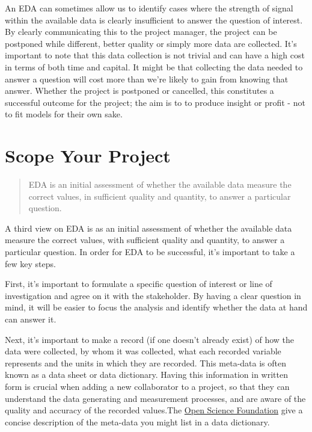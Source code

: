 \documentclass[
  letterpaper,
  DIV=11,
  numbers=noendperiod]{scrreprt}
\begin{document}
An EDA can sometimes allow us to identify cases where the strength of
signal within the available data is clearly insufficient to answer the
question of interest. By clearly communicating this to the project
manager, the project can be postponed while different, better quality or
simply more data are collected. It's important to note that this data
collection is not trivial and can have a high cost in terms of both time
and capital. It might be that collecting the data needed to answer a
question will cost more than we're likely to gain from knowing that
answer. Whether the project is postponed or cancelled, this constitutes
a successful outcome for the project; the aim is to to produce insight
or profit - not to fit models for their own sake.

\section{Scope Your Project}\label{scope-your-project}

\begin{quote}
EDA is an initial assessment of whether the available data measure the
correct values, in sufficient quality and quantity, to answer a
particular question.
\end{quote}

A third view on EDA is as an initial assessment of whether the available
data measure the correct values, with sufficient quality and quantity,
to answer a particular question. In order for EDA to be successful, it's
important to take a few key steps.

First, it's important to formulate a specific question of interest or
line of investigation and agree on it with the stakeholder. By having a
clear question in mind, it will be easier to focus the analysis and
identify whether the data at hand can answer it.

Next, it's important to make a record (if one doesn't already exist) of
how the data were collected, by whom it was collected, what each
recorded variable represents and the units in which they are recorded.
This meta-data is often known as a data sheet or data dictionary. Having
this information in written form is crucial when adding a new
collaborator to a project, so that they can understand the data
generating and measurement processes, and are aware of the quality and
accuracy of the recorded values.The
\href{https://help.osf.io/article/217-how-to-make-a-data-dictionary}{Open
Science Foundation} give a concise description of the meta-data you
might list in a data dictionary.
\end{document}
